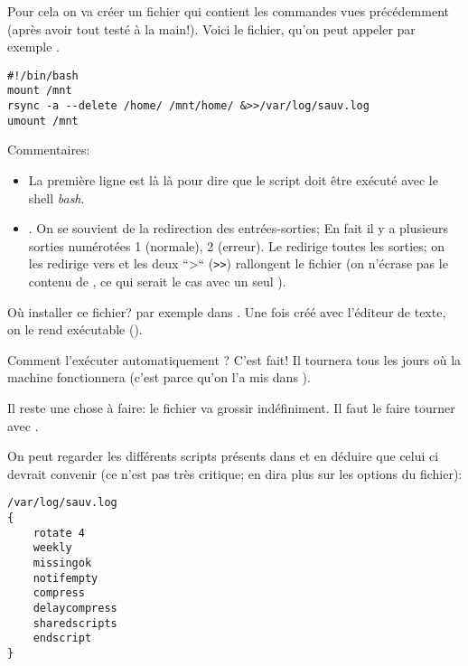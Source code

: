Pour cela on va créer un fichier qui contient les commandes vues précédemment
(après avoir tout testé à la main!). Voici le fichier, qu'on peut
  appeler par exemple .

  \begin{center}
  \begin{boxedminipage}{0.85\textwidth}
\begin{verbatim}
#!/bin/bash
mount /mnt
rsync -a --delete /home/ /mnt/home/ &>>/var/log/sauv.log
umount /mnt
\end{verbatim}
  \end{boxedminipage}
  \end{center}

Commentaires:
\begin{itemize}
  \item La première ligne est là là pour dire que le script doit être exécuté
    avec le shell \emph{bash}.
  \item  {}. On se souvient de la
    redirection des entrées-sorties; En fait il y a plusieurs sorties
    numérotées 1 (normale), 2 (erreur). Le \ttt{\&} redirige toutes
    les sorties; on les redirige vers  et les deux ``>``
    (\texttt{>>}) rallongent le fichier   (on
    n'écrase pas le contenu de  , ce qui serait
    le cas avec un seul \ttt{>}).
\end{itemize}

Où installer ce fichier? par exemple dans . Une
fois créé avec l'éditeur de texte, on le rend exécutable ().


Comment l'exécuter automatiquement ? C'est fait! Il tournera tous les
jours où la machine fonctionnera (c'est parce qu'on l'a mis dans
).


Il reste une chose à faire: le fichier   va
grossir indéfiniment. Il faut le faire \og tourner\fg{} avec
.

On peut regarder les différents scripts présents dans
et en déduire que celui ci devrait convenir (ce n'est pas très
critique;  en dira plus sur les options du fichier):
\begin{center}
  \begin{boxedminipage}{0.85\textwidth}
  \begin{verbatim}
/var/log/sauv.log
{
	rotate 4
	weekly
	missingok
	notifempty
	compress
	delaycompress
	sharedscripts
	endscript
}
\end{verbatim}
  \end{boxedminipage}
\end{center}

